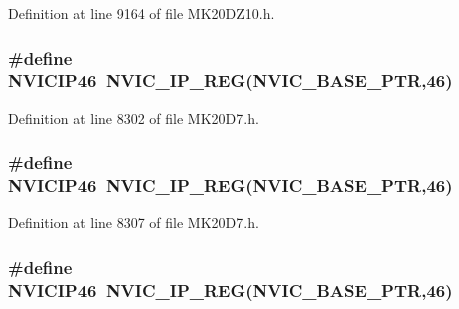 Definition at line 9164 of file M\+K20\+D\+Z10.\+h.

\subsubsection[{\texorpdfstring{N\+V\+I\+C\+I\+P46}{NVICIP46}}]{\setlength{\rightskip}{0pt plus 5cm}\#define N\+V\+I\+C\+I\+P46~{\bf N\+V\+I\+C\+\_\+\+I\+P\+\_\+\+R\+EG}({\bf N\+V\+I\+C\+\_\+\+B\+A\+S\+E\+\_\+\+P\+TR},46)}\hypertarget{group___n_v_i_c___register___accessor___macros_ga8846494cf7223e189707aeddcd67865c}{}\label{group___n_v_i_c___register___accessor___macros_ga8846494cf7223e189707aeddcd67865c}


Definition at line 8302 of file M\+K20\+D7.\+h.

\subsubsection[{\texorpdfstring{N\+V\+I\+C\+I\+P46}{NVICIP46}}]{\setlength{\rightskip}{0pt plus 5cm}\#define N\+V\+I\+C\+I\+P46~{\bf N\+V\+I\+C\+\_\+\+I\+P\+\_\+\+R\+EG}({\bf N\+V\+I\+C\+\_\+\+B\+A\+S\+E\+\_\+\+P\+TR},46)}\hypertarget{group___n_v_i_c___register___accessor___macros_ga8846494cf7223e189707aeddcd67865c}{}\label{group___n_v_i_c___register___accessor___macros_ga8846494cf7223e189707aeddcd67865c}


Definition at line 8307 of file M\+K20\+D7.\+h.

\subsubsection[{\texorpdfstring{N\+V\+I\+C\+I\+P46}{NVICIP46}}]{\setlength{\rightskip}{0pt plus 5cm}\#define N\+V\+I\+C\+I\+P46~{\bf N\+V\+I\+C\+\_\+\+I\+P\+\_\+\+R\+EG}({\bf N\+V\+I\+C\+\_\+\+B\+A\+S\+E\+\_\+\+P\+TR},46)}\hypertarget{group___n_v_i_c___register___accessor___macros_ga8846494cf7223e189707aeddcd67865c}{}\label{group___n_v_i_c___register___accessor___macros_ga8846494cf7223e189707aeddcd67865c}


